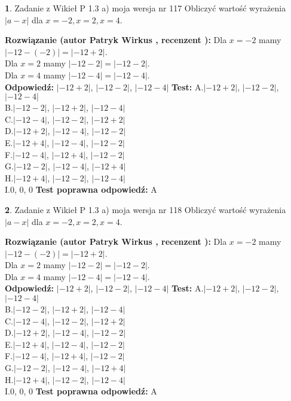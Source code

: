 \documentclass[12pt, a4paper]{article}
\theoremstyle{definition} %
\newtheorem{zad}{}
\newcommand{\zadStart}[1]{\begin{zad}#1\newline}
\newcommand{\zadStop}{\end{zad}}
\newcommand{\rozwStart}[2]{\noindent \textbf{Rozwiązanie (autor #1 , recenzent #2): }\newline}
\newcommand{\rozwStop}{\newline}
\newcommand{\odpStart}{\noindent \textbf{Odpowiedź:}\newline}
\newcommand{\odpStop}{\newline}
\newcommand{\testStart}{\noindent \textbf{Test:}\newline}
\newcommand{\testStop}{\newline}
\newcommand{\kluczStart}{\noindent \textbf{Test poprawna odpowiedź:}\newline}
\newcommand{\kluczStop}{\newline}
\begin{document}
\zadStart{Zadanie z Wikieł P 1.3 a) moja wersja nr 117}
Obliczyć wartość wyrażenia $|a - x|$ dla $x=-2,x=2,x=4$.
\zadStop
\rozwStart{Patryk Wirkus}{}
Dla $x = -2$ mamy $|-12 - (-2)| = |-12 + 2|$.\\
Dla $x = 2$ mamy $|-12 - 2| = |-12 - 2|$.\\
Dla $x = 4$ mamy $|-12 - 4| = |-12 - 4|$.\\
\rozwStop
\odpStart
$|-12 + 2|$, $|-12 - 2|$, $|-12 - 4|$
\odpStop
\testStart
A.$|-12 + 2|$, $|-12 - 2|$, $|-12 - 4|$\\
B.$|-12 - 2|$, $|-12 + 2|$, $|-12 - 4|$\\
C.$|-12 - 4|$, $|-12 - 2|$, $|-12 + 2|$\\
D.$|-12 + 2|$, $|-12 - 4|$, $|-12 - 2|$\\
E.$|-12 + 4|$, $|-12 - 4|$, $|-12 - 2|$\\
F.$|-12 - 4|$, $|-12 + 4|$, $|-12 - 2|$\\
G.$|-12 - 2|$, $|-12 - 4|$, $|-12 + 4|$\\
H.$|-12 + 4|$, $|-12 - 2|$, $|-12 - 4|$\\
I.$0$, $0$, $0$
\testStop
\kluczStart
A
\kluczStop



\zadStart{Zadanie z Wikieł P 1.3 a) moja wersja nr 118}
Obliczyć wartość wyrażenia $|a - x|$ dla $x=-2,x=2,x=4$.
\zadStop
\rozwStart{Patryk Wirkus}{}
Dla $x = -2$ mamy $|-12 - (-2)| = |-12 + 2|$.\\
Dla $x = 2$ mamy $|-12 - 2| = |-12 - 2|$.\\
Dla $x = 4$ mamy $|-12 - 4| = |-12 - 4|$.\\
\rozwStop
\odpStart
$|-12 + 2|$, $|-12 - 2|$, $|-12 - 4|$
\odpStop
\testStart
A.$|-12 + 2|$, $|-12 - 2|$, $|-12 - 4|$\\
B.$|-12 - 2|$, $|-12 + 2|$, $|-12 - 4|$\\
C.$|-12 - 4|$, $|-12 - 2|$, $|-12 + 2|$\\
D.$|-12 + 2|$, $|-12 - 4|$, $|-12 - 2|$\\
E.$|-12 + 4|$, $|-12 - 4|$, $|-12 - 2|$\\
F.$|-12 - 4|$, $|-12 + 4|$, $|-12 - 2|$\\
G.$|-12 - 2|$, $|-12 - 4|$, $|-12 + 4|$\\
H.$|-12 + 4|$, $|-12 - 2|$, $|-12 - 4|$\\
I.$0$, $0$, $0$
\testStop
\kluczStart
A
\kluczStop
\end{document}
